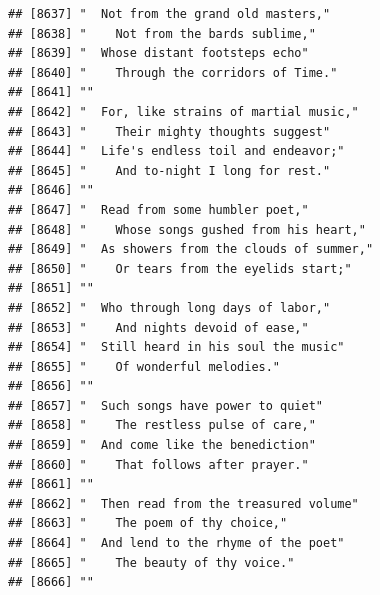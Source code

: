 \documentclass{article}\usepackage[]{graphicx}\usepackage[]{color}
\makeatletter
\newenvironment{kframe}{%
 \def\at@end@of@kframe{}%
 \ifinner\ifhmode%
  \def\at@end@of@kframe{\end{minipage}}%
  \begin{minipage}{\columnwidth}%
 \fi\fi%
 \def\FrameCommand##1{\hskip\@totalleftmargin \hskip-\fboxsep
 \colorbox{shadecolor}{##1}\hskip-\fboxsep
     \hskip-\linewidth \hskip-\@totalleftmargin \hskip\columnwidth}%
 \MakeFramed {\advance\hsize-\width
   \@totalleftmargin\z@ \linewidth\hsize
   \@setminipage}}%
 {\par\unskip\endMakeFramed%
 \at@end@of@kframe}
\newenvironment{knitrout}{}{} %
\makeatother
\begin{document}
\begin{knitrout}
\begin{kframe}
\begin{verbatim}
## [8637] "  Not from the grand old masters,"                                           
## [8638] "    Not from the bards sublime,"                                             
## [8639] "  Whose distant footsteps echo"                                              
## [8640] "    Through the corridors of Time."                                          
## [8641] ""                                                                            
## [8642] "  For, like strains of martial music,"                                       
## [8643] "    Their mighty thoughts suggest"                                           
## [8644] "  Life's endless toil and endeavor;"                                         
## [8645] "    And to-night I long for rest."                                           
## [8646] ""                                                                            
## [8647] "  Read from some humbler poet,"                                              
## [8648] "    Whose songs gushed from his heart,"                                      
## [8649] "  As showers from the clouds of summer,"                                     
## [8650] "    Or tears from the eyelids start;"                                        
## [8651] ""                                                                            
## [8652] "  Who through long days of labor,"                                           
## [8653] "    And nights devoid of ease,"                                              
## [8654] "  Still heard in his soul the music"                                         
## [8655] "    Of wonderful melodies."                                                  
## [8656] ""                                                                            
## [8657] "  Such songs have power to quiet"                                            
## [8658] "    The restless pulse of care,"                                             
## [8659] "  And come like the benediction"                                             
## [8660] "    That follows after prayer."                                              
## [8661] ""                                                                            
## [8662] "  Then read from the treasured volume"                                       
## [8663] "    The poem of thy choice,"                                                 
## [8664] "  And lend to the rhyme of the poet"                                         
## [8665] "    The beauty of thy voice."                                                
## [8666] ""                                                                            

\end{verbatim}
\end{kframe}
\end{knitrout}
\end{document}
